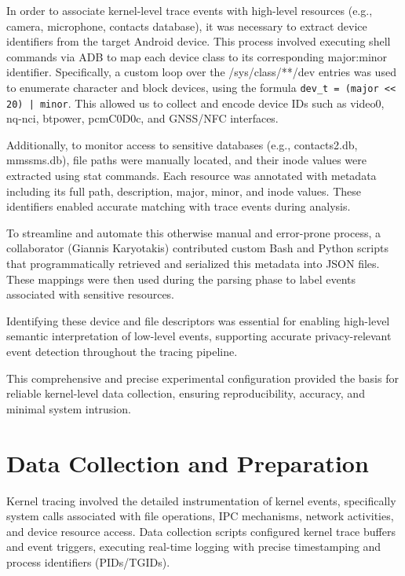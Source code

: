\documentclass[a4paper,12pt]{report}
\begin{document}
In order to associate kernel-level trace events with high-level resources (e.g., camera, microphone, contacts database), it was necessary to extract device identifiers from the target Android device. This process involved executing shell commands via ADB to map each device class to its corresponding major:minor identifier. Specifically, a custom loop over the /sys/class/**/dev entries was used to enumerate character and block devices, using the formula \texttt{dev\_t = (major << 20) | minor}. This allowed us to collect and encode device IDs such as video0, nq-nci, btpower, pcmC0D0c, and GNSS/NFC interfaces.

Additionally, to monitor access to sensitive databases (e.g., contacts2.db, mmssms.db), file paths were manually located, and their inode values were extracted using stat commands. Each resource was annotated with metadata including its full path, description, major, minor, and inode values. These identifiers enabled accurate matching with trace events during analysis.

To streamline and automate this otherwise manual and error-prone process, a collaborator (Giannis Karyotakis) contributed custom Bash and Python scripts that programmatically retrieved and serialized this metadata into JSON files. These mappings were then used during the parsing phase to label events associated with sensitive resources.

Identifying these device and file descriptors was essential for enabling high-level semantic interpretation of low-level events, supporting accurate privacy-relevant event detection throughout the tracing pipeline.

This comprehensive and precise experimental configuration provided the basis for reliable kernel-level data collection, ensuring reproducibility, accuracy, and minimal system intrusion.

\section{Data Collection and Preparation}
Kernel tracing involved the detailed instrumentation of kernel events, specifically system calls associated with file operations, IPC mechanisms, network activities, and device resource access. Data collection scripts configured kernel trace buffers and event triggers, executing real-time logging with precise timestamping and process identifiers (PIDs/TGIDs).
\end{document}
